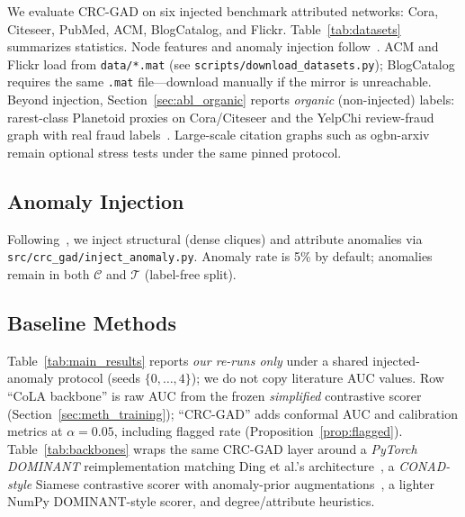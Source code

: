 \documentclass[a4paper]{cas-dc}
\theoremstyle{definition}
\begin{document}
We evaluate CRC-GAD on six injected benchmark attributed networks: Cora, Citeseer, PubMed, ACM, BlogCatalog, and Flickr.  Table~\ref{tab:datasets} summarizes statistics.  Node features and anomaly injection follow~\cite{ding2019dominant,liu2022cola}.  ACM and Flickr load from \texttt{data/*.mat} (see \texttt{scripts/download\_datasets.py}); BlogCatalog requires the same \texttt{.mat} file---download manually if the mirror is unreachable.  Beyond injection, Section~\ref{sec:abl_organic} reports \emph{organic} (non-injected) labels: rarest-class Planetoid proxies on Cora/Citeseer and the YelpChi review-fraud graph with real fraud labels~\cite{xu2022conad}.  Large-scale citation graphs such as ogbn-arxiv remain optional stress tests under the same pinned protocol.

\subsection{Anomaly Injection}
\label{sec:exp_injection}

Following~\cite{ding2019dominant,liu2022cola}, we inject structural (dense cliques) and attribute anomalies via \texttt{src/crc\_gad/inject\_anomaly.py}.  Anomaly rate is 5\% by default; anomalies remain in both $\mathcal{C}$ and $\mathcal{T}$ (label-free split).

\subsection{Baseline Methods}
\label{sec:exp_baselines}

Table~\ref{tab:main_results} reports \emph{our re-runs only} under a shared injected-anomaly protocol (seeds $\{0,\ldots,4\}$); we do not copy literature AUC values.  Row ``CoLA backbone'' is raw AUC from the frozen \emph{simplified} contrastive scorer (Section~\ref{sec:meth_training}); ``CRC-GAD'' adds conformal AUC and calibration metrics at $\alpha=0.05$, including flagged rate (Proposition~\ref{prop:flagged}).  Table~\ref{tab:backbones} wraps the same CRC-GAD layer around a \emph{PyTorch DOMINANT} reimplementation matching Ding et al.'s architecture~\cite{ding2019dominant}, a \emph{CONAD-style} Siamese contrastive scorer with anomaly-prior augmentations~\cite{xu2022conad}, a lighter NumPy DOMINANT-style scorer, and degree/attribute heuristics.
\end{document}
